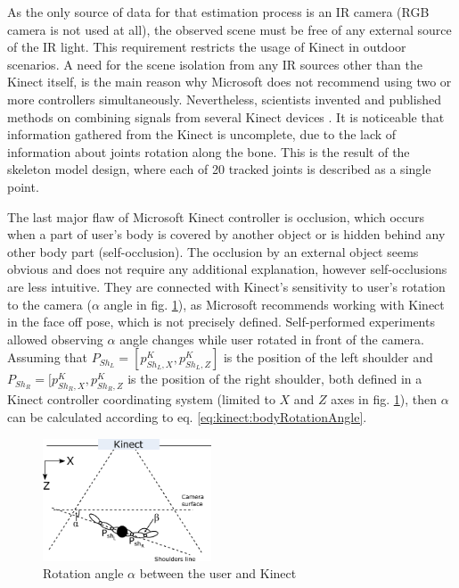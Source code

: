 \documentclass[sensors,article,submit,moreauthors,pdftex,10pt,a4paper]{mdpi}
\begin{document}
As the only source of data for that estimation process is an IR camera (RGB camera is not used at all), the observed scene must be free of any external source of the IR light. This requirement restricts the usage of Kinect in outdoor scenarios. A need for the scene isolation from any IR sources other than the Kinect itself, is the main reason why Microsoft does not recommend using two or more controllers simultaneously. Nevertheless, scientists invented and published methods on combining signals from several Kinect devices \cite{Asteriadis2013,Kitsikidis2011,Schroder2011}. It is noticeable that information gathered from the Kinect is uncomplete, due to the lack of information about joints rotation along the bone. This is the result of the skeleton model design, where each of 20 tracked joints is described as a single point.

The last major flaw of Microsoft Kinect controller is occlusion, which occurs when a part of user’s body is covered by another object or is hidden behind any other body part (self-occlusion). The occlusion by an external object seems obvious and does not require any additional explanation, however self-occlusions are less intuitive. They are connected with Kinect’s sensitivity to user’s rotation to the camera ($\alpha$ angle in fig. \ref{fig:kinect:rotationAngle}), as Microsoft recommends working with Kinect in the face off pose, which is not precisely defined. Self-performed experiments allowed observing $\alpha$ angle changes while user rotated in front of the camera. Assuming that $P_{Sh_L} = [p^K_{{Sh}_L,X} , p^K_{{Sh}_L,Z}]$ is the position of the left shoulder and $P_{Sh_R} = [p^K_{{Sh}_R,X} , p^K_{{Sh}_R,Z}$ is the position of the right shoulder, both defined in a Kinect controller coordinating system (limited to $X$ and $Z$ axes in fig. \ref{fig:kinect:rotationAngle}), then $\alpha$ can be calculated according to eq. \ref{eq:kinect:bodyRotationAngle}.

\begin{figure}[H]
	\centering
	\includegraphics[width=5cm]{Figure3.png}
	\caption{Rotation angle $\alpha$ between the user and Kinect}
	\label{fig:kinect:rotationAngle}
\end{figure}
\end{document}
